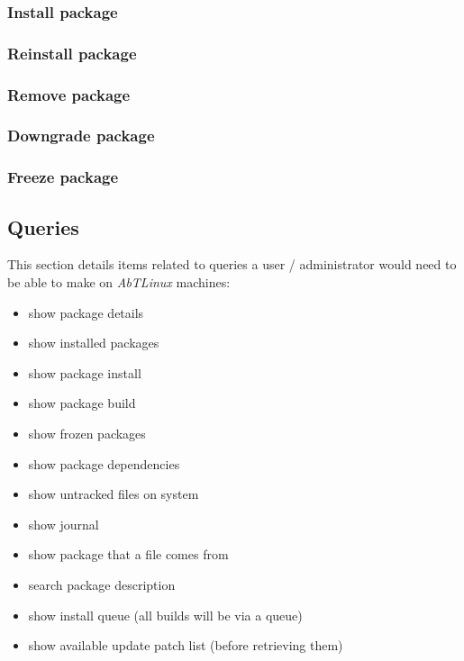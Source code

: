 %
%
\subsubsection{Install package}


\newpage
\subsubsection{Reinstall package}


\newpage
\subsubsection{Remove package}


\newpage
\subsubsection{Downgrade package}


\newpage
\subsubsection{Freeze package}



\newpage
\subsection{Queries}
This section details items related to queries a user / administrator would need to be
able to make on \emph{AbTLinux} machines:

\begin{itemize}
  \item show package details
  \item show installed packages
  \item show package install
  \item show package build
  \item show frozen packages
  \item show package dependencies
  \item show untracked files on system
  \item show journal
  \item show package that a file comes from
  \item search package description
  \item show install queue (all builds will be via a queue)
  \item show available update patch list (before retrieving them)
\end{itemize}

